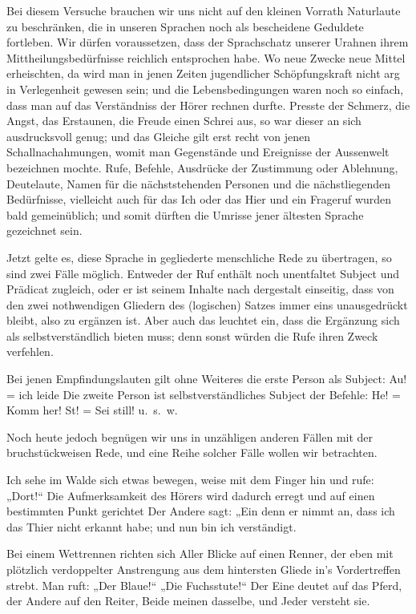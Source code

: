 Bei diesem Versuche brauchen wir uns nicht auf den kleinen Vorrath  Naturlaute zu beschränken, die in unseren Sprachen noch als bescheidene Geduldete fortleben. Wir dürfen voraussetzen, dass der Sprachschatz unserer Urahnen ihrem Mittheilungsbedürfnisse reichlich entsprochen habe. Wo neue Zwecke neue Mittel erheischten, da wird man in jenen Zeiten jugendlicher Schöpfungskraft nicht arg in Verlegenheit gewesen sein; und die Lebensbedingungen waren noch so einfach, dass man auf das Verständniss der Hörer rechnen durfte. Presste der Schmerz, die Angst, das Erstaunen, die Freude einen Schrei aus, so war dieser an sich ausdrucksvoll genug; und das Gleiche \label{sp.366} gilt erst recht von jenen Schallnachahmungen, womit man Gegenstände und Ereignisse der Aussenwelt bezeichnen mochte. Rufe, Befehle, Ausdrücke der Zustimmung oder Ablehnung, Deutelaute, Namen für die nächststehenden Personen und die nächstliegenden Bedürfnisse, vielleicht auch für das Ich oder das Hier und ein Frageruf wurden bald gemeinüblich; und somit dürften die Umrisse jener ältesten Sprache gezeichnet sein.

Jetzt gelte es, diese Sprache in gegliederte menschliche Rede zu übertragen, so sind zwei Fälle möglich. Entweder der Ruf enthält noch unentfaltet Subject und Prädicat zugleich, oder er ist seinem Inhalte nach dergestalt einseitig, dass von den zwei nothwendigen Gliedern des (logischen) Satzes immer eins unausgedrückt bleibt, also zu ergänzen ist. Aber auch das leuchtet ein, dass die Ergänzung sich als selbstverständlich bieten muss; denn sonst würden die Rufe ihren Zweck verfehlen.

Bei jenen Empfindungslauten gilt ohne Weiteres die erste Person als Subject: Au! = ich leide  Die zweite Person ist selbstverständliches Subject der Befehle: He! = Komm her! St! = Sei still! u.~s.~w.

Noch heute jedoch begnügen wir uns in unzähligen anderen Fällen mit der bruchstückweisen Rede, und eine Reihe solcher Fälle wollen wir betrachten.

Ich sehe im Walde sich etwas bewegen, weise mit dem Finger hin und rufe: „Dort!“ Die Aufmerksamkeit des Hörers wird dadurch erregt und auf einen bestimmten Punkt gerichtet Der Andere sagt: „Ein  denn er nimmt an, dass ich das Thier nicht erkannt habe; und nun bin ich verständigt.

Bei einem Wettrennen richten sich Aller Blicke auf einen Renner, der eben mit plötzlich verdoppelter Anstrengung aus dem hintersten Gliede in’s Vordertreffen strebt. Man ruft: „Der Blaue!“ „Die Fuchs\label{fp.350}stute!“ Der Eine deutet auf das Pferd, der Andere auf den Reiter, Beide meinen dasselbe, und Jeder versteht sie.

